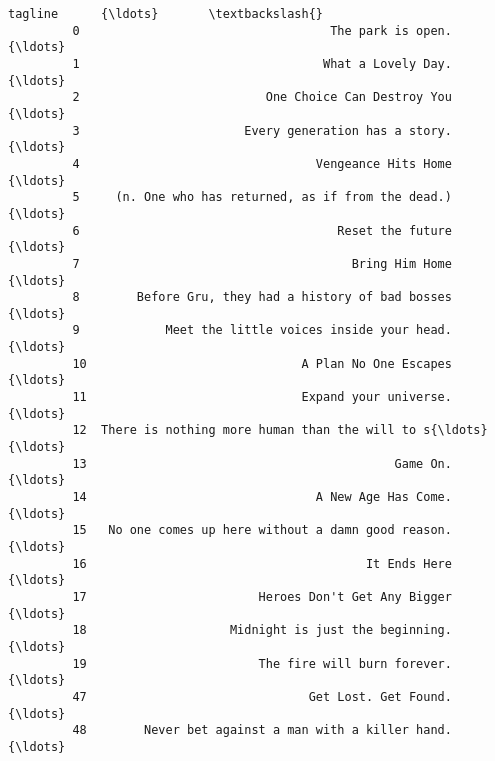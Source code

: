 \documentclass[11pt]{article}
\begin{document}
\begin{Verbatim}[commandchars=\\\{\}]
                                                       tagline      {\ldots}       \textbackslash{}
         0                                   The park is open.      {\ldots}        
         1                                  What a Lovely Day.      {\ldots}        
         2                          One Choice Can Destroy You      {\ldots}        
         3                       Every generation has a story.      {\ldots}        
         4                                 Vengeance Hits Home      {\ldots}        
         5     (n. One who has returned, as if from the dead.)      {\ldots}        
         6                                    Reset the future      {\ldots}        
         7                                      Bring Him Home      {\ldots}        
         8        Before Gru, they had a history of bad bosses      {\ldots}        
         9            Meet the little voices inside your head.      {\ldots}        
         10                              A Plan No One Escapes      {\ldots}        
         11                              Expand your universe.      {\ldots}        
         12  There is nothing more human than the will to s{\ldots}      {\ldots}        
         13                                           Game On.      {\ldots}        
         14                                A New Age Has Come.      {\ldots}        
         15   No one comes up here without a damn good reason.      {\ldots}        
         16                                       It Ends Here      {\ldots}        
         17                        Heroes Don't Get Any Bigger      {\ldots}        
         18                    Midnight is just the beginning.      {\ldots}        
         19                        The fire will burn forever.      {\ldots}        
         47                               Get Lost. Get Found.      {\ldots}        
         48        Never bet against a man with a killer hand.      {\ldots}        
         

\end{Verbatim}
\end{document}
